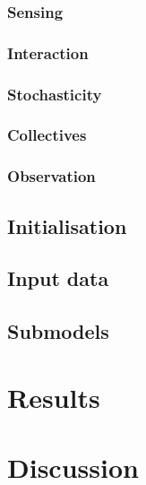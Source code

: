 \documentclass[DIV=calc,BCOR=0mm,pagesize]{scrartcl}
\begin{document}
\subsubsection{Sensing}
\subsubsection{Interaction}
\subsubsection{Stochasticity}
\subsubsection{Collectives}
\subsubsection{Observation}

\subsection{Initialisation}
\label{ssec:modini}

\subsection{Input data}
\label{ssec:modinp}

\subsection{Submodels}
\label{ssec:modsub}

\section{Results}
\label{sec:res}

\section{Discussion}
\label{sec:dis}


\newpage\twocolumn\recalctypearea
\end{document}
